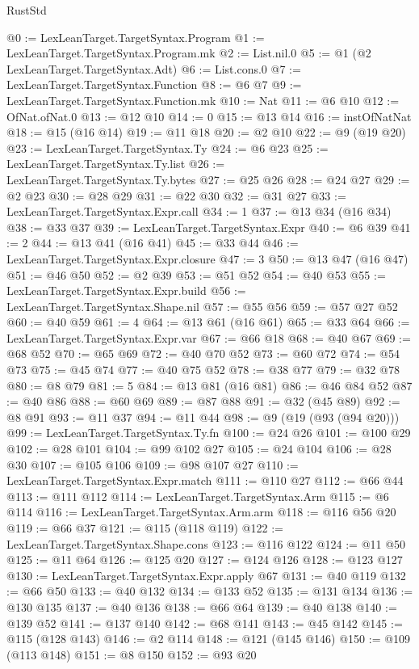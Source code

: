 \begin{lexlean}{RustStd}
\begin{coremodule}
{\begin{coremodule}
{{{{{{{{{{{{{{{{{{{{{{{{{{{{{{{{{{{{{{@0 := LexLeanTarget.TargetSyntax.Program
@1 := LexLeanTarget.TargetSyntax.Program.mk
@2 := List.nil.{0}
@5 := @1 (@2 LexLeanTarget.TargetSyntax.Adt)
@6 := List.cons.{0}
@7 := LexLeanTarget.TargetSyntax.Function
@8 := @6 @7
@9 := LexLeanTarget.TargetSyntax.Function.mk
@10 := Nat
@11 := @6 @10
@12 := OfNat.ofNat.{0}
@13 := @12 @10
@14 := 0
@15 := @13 @14
@16 := instOfNatNat
@18 := @15 (@16 @14)
@19 := @11 @18
@20 := @2 @10
@22 := @9 (@19 @20)
@23 := LexLeanTarget.TargetSyntax.Ty
@24 := @6 @23
@25 := LexLeanTarget.TargetSyntax.Ty.list
@26 := LexLeanTarget.TargetSyntax.Ty.bytes
@27 := @25 @26
@28 := @24 @27
@29 := @2 @23
@30 := @28 @29
@31 := @22 @30
@32 := @31 @27
@33 := LexLeanTarget.TargetSyntax.Expr.call
@34 := 1
@37 := @13 @34 (@16 @34)
@38 := @33 @37
@39 := LexLeanTarget.TargetSyntax.Expr
@40 := @6 @39
@41 := 2
@44 := @13 @41 (@16 @41)
@45 := @33 @44
@46 := LexLeanTarget.TargetSyntax.Expr.closure
@47 := 3
@50 := @13 @47 (@16 @47)
@51 := @46 @50
@52 := @2 @39
@53 := @51 @52
@54 := @40 @53
@55 := LexLeanTarget.TargetSyntax.Expr.build
@56 := LexLeanTarget.TargetSyntax.Shape.nil
@57 := @55 @56
@59 := @57 @27 @52
@60 := @40 @59
@61 := 4
@64 := @13 @61 (@16 @61)
@65 := @33 @64
@66 := LexLeanTarget.TargetSyntax.Expr.var
@67 := @66 @18
@68 := @40 @67
@69 := @68 @52
@70 := @65 @69
@72 := @40 @70 @52
@73 := @60 @72
@74 := @54 @73
@75 := @45 @74
@77 := @40 @75 @52
@78 := @38 @77
@79 := @32 @78
@80 := @8 @79
@81 := 5
@84 := @13 @81 (@16 @81)
@86 := @46 @84 @52
@87 := @40 @86
@88 := @60 @69
@89 := @87 @88
@91 := @32 (@45 @89)
@92 := @8 @91
@93 := @11 @37
@94 := @11 @44
@98 := @9 (@19 (@93 (@94 @20)))
@99 := LexLeanTarget.TargetSyntax.Ty.fn
@100 := @24 @26
@101 := @100 @29
@102 := @28 @101
@104 := @99 @102 @27
@105 := @24 @104
@106 := @28 @30
@107 := @105 @106
@109 := @98 @107 @27
@110 := LexLeanTarget.TargetSyntax.Expr.match
@111 := @110 @27
@112 := @66 @44
@113 := @111 @112
@114 := LexLeanTarget.TargetSyntax.Arm
@115 := @6 @114
@116 := LexLeanTarget.TargetSyntax.Arm.arm
@118 := @116 @56 @20
@119 := @66 @37
@121 := @115 (@118 @119)
@122 := LexLeanTarget.TargetSyntax.Shape.cons
@123 := @116 @122
@124 := @11 @50
@125 := @11 @64
@126 := @125 @20
@127 := @124 @126
@128 := @123 @127
@130 := LexLeanTarget.TargetSyntax.Expr.apply @67
@131 := @40 @119
@132 := @66 @50
@133 := @40 @132
@134 := @133 @52
@135 := @131 @134
@136 := @130 @135
@137 := @40 @136
@138 := @66 @64
@139 := @40 @138
@140 := @139 @52
@141 := @137 @140
@142 := @68 @141
@143 := @45 @142
@145 := @115 (@128 @143)
@146 := @2 @114
@148 := @121 (@145 @146)
@150 := @109 (@113 @148)
@151 := @8 @150
@152 := @93 @20
}}}}}}}}}}}}}}}}}}}}}}}}}}}}}}}}}}}}}}
\end{coremodule}}
\end{coremodule}
\end{lexlean}
